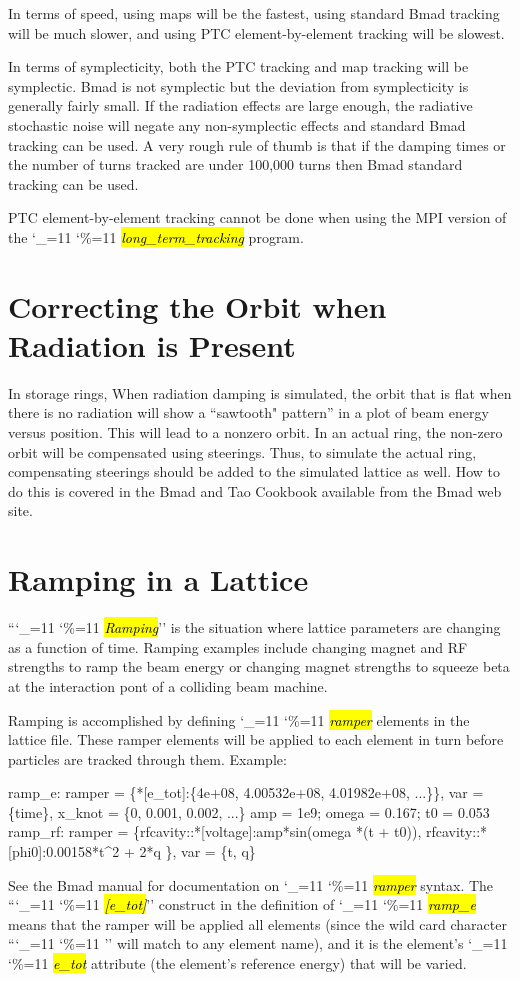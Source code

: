 \documentclass{hitec}
\newcommand\dottcmd[1]{\hl{\em#1}\endgroup}
\newcommand{\vn}{\begingroup\catcode`\_=11 \catcode`\%=11 \dottcmd}
\newcommand{\ltt}{\vn{long_term_tracking}\xspace}
\newcommand{\Section}[1]{\section{#1}\vspace*{-1ex}}
\begin{document}
{{{{{{{{{{{{In terms of speed, using maps will be the fastest, using standard Bmad tracking will be much
slower, and using PTC element-by-element tracking will be slowest.

In terms of symplecticity, both the PTC tracking and map tracking will be symplectic.
Bmad is not symplectic but the deviation from symplecticity is generally fairly small. If the
radiation effects are large enough, the radiative stochastic noise will negate any non-symplectic
effects and standard Bmad tracking can be used. A very rough rule of thumb is that if the damping times
or the number of turns tracked are under 100,000 turns then Bmad standard tracking can be used.

PTC element-by-element tracking cannot be done when using the MPI version of the \ltt program.

\Section{Correcting the Orbit when Radiation is Present}

In storage rings, When radiation damping is simulated, the orbit that is flat when there is no
radiation will show a ``sawtooth" pattern'' in a plot of beam energy versus position. This will lead
to a nonzero orbit. In an actual ring, the non-zero orbit will be compensated using steerings. Thus,
to simulate the actual ring, compensating steerings should be added to the simulated lattice as
well. How to do this is covered in the Bmad and Tao Cookbook available from the Bmad web site.

\Section{Ramping in a Lattice}
\label{s:ramp}

``\vn{Ramping}'' is the situation where lattice parameters are changing as a function of
time. Ramping examples include changing magnet and RF strengths to ramp the beam energy or changing
magnet strengths to squeeze beta at the interaction pont of a colliding beam machine.

Ramping is accomplished by defining \vn{ramper} elements in the lattice file. These ramper elements
will be applied to each element in turn before particles are tracked through them. Example:
\begin{code}
  ramp_e: ramper = \{*[e_tot]:\{4e+08, 4.00532e+08, 4.01982e+08, ...\}\},
                var = \{time\}, x_knot = \{0, 0.001, 0.002, ...\}
  amp = 1e9;  omega = 0.167;  t0 = 0.053
  ramp_rf: ramper = \{rfcavity::*[voltage]:amp*sin(omega *(t + t0)),
        rfcavity::*[phi0]:0.00158*t^2 + 2*q \}, var = \{t, q\}
\end{code}
See the Bmad manual for documentation on \vn{ramper} syntax. The ``\vn{*[e_tot]}'' construct in the
definition of \vn{ramp_e} means that the ramper will be applied all elements (since the wild card
character ``\vn{*}'' will match to any element name), and it is the element's \vn{e_tot} attribute
(the element's reference energy) that will be varied.

}}}}}}}}}}}}
\end{document}
